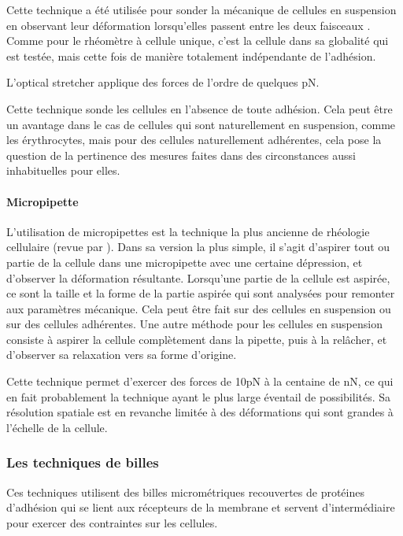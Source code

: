 Cette technique a été utilisée pour sonder la mécanique de cellules en suspension en observant leur déformation lorsqu'elles passent entre les deux faisceaux \parencite{guck_optical_2001}. 
Comme pour le rhéomètre à cellule unique, c'est la cellule dans sa globalité qui est testée, mais cette fois de manière totalement indépendante de l'adhésion. 

L'optical stretcher applique des forces de l'ordre de quelques pN. 

Cette technique sonde les cellules en l'absence de toute adhésion. Cela peut être un avantage dans le cas de cellules qui sont naturellement en suspension, comme les érythrocytes, mais pour des cellules naturellement adhérentes, cela pose la question de la pertinence des mesures faites dans des circonstances aussi inhabituelles pour elles. 

\paragraph{Micropipette}

L'utilisation de micropipettes est la technique la plus ancienne de rhéologie cellulaire (revue par \cite{hochmuth_micropipette_2000}). 
Dans sa version la plus simple, il s'agit d'aspirer tout ou partie de la cellule dans une micropipette avec une certaine dépression, et d'observer la déformation résultante. 
Lorsqu'une partie de la cellule est aspirée, ce sont la taille et la forme de la partie aspirée qui sont analysées pour remonter aux paramètres mécanique. 
Cela peut être fait sur des cellules en suspension ou sur des cellules adhérentes.
Une autre méthode pour les cellules en suspension consiste à aspirer la cellule complètement dans la pipette, puis à la relâcher, et d'observer sa relaxation vers sa forme d'origine. 

 

Cette technique permet d'exercer des forces de 10pN à la centaine de nN, ce qui en fait probablement la technique ayant le plus large éventail de possibilités. Sa résolution spatiale est en revanche limitée à des déformations qui sont grandes à l'échelle de la cellule. 



\subsubsection{Les techniques de billes}
Ces techniques utilisent des billes micrométriques recouvertes de protéines d'adhésion qui se lient aux récepteurs de la membrane et servent d'intermédiaire pour exercer des contraintes sur les cellules. 

